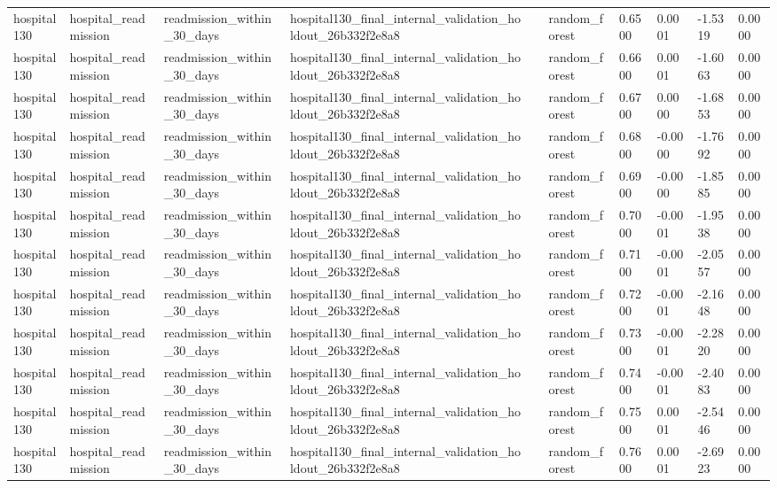 \begin{tabular}{llllllllll}
hospital130 & hospital\_readmission & readmission\_within\_30\_days & hospital130\_final\_internal\_validation\_holdout\_26b332f2e8a8 &  & random\_forest & 0.6500 & 0.0001 & -1.5319 & 0.0000 \\
hospital130 & hospital\_readmission & readmission\_within\_30\_days & hospital130\_final\_internal\_validation\_holdout\_26b332f2e8a8 &  & random\_forest & 0.6600 & 0.0001 & -1.6063 & 0.0000 \\
hospital130 & hospital\_readmission & readmission\_within\_30\_days & hospital130\_final\_internal\_validation\_holdout\_26b332f2e8a8 &  & random\_forest & 0.6700 & 0.0000 & -1.6853 & 0.0000 \\
hospital130 & hospital\_readmission & readmission\_within\_30\_days & hospital130\_final\_internal\_validation\_holdout\_26b332f2e8a8 &  & random\_forest & 0.6800 & -0.0000 & -1.7692 & 0.0000 \\
hospital130 & hospital\_readmission & readmission\_within\_30\_days & hospital130\_final\_internal\_validation\_holdout\_26b332f2e8a8 &  & random\_forest & 0.6900 & -0.0000 & -1.8585 & 0.0000 \\
hospital130 & hospital\_readmission & readmission\_within\_30\_days & hospital130\_final\_internal\_validation\_holdout\_26b332f2e8a8 &  & random\_forest & 0.7000 & -0.0001 & -1.9538 & 0.0000 \\
hospital130 & hospital\_readmission & readmission\_within\_30\_days & hospital130\_final\_internal\_validation\_holdout\_26b332f2e8a8 &  & random\_forest & 0.7100 & -0.0001 & -2.0557 & 0.0000 \\
hospital130 & hospital\_readmission & readmission\_within\_30\_days & hospital130\_final\_internal\_validation\_holdout\_26b332f2e8a8 &  & random\_forest & 0.7200 & -0.0001 & -2.1648 & 0.0000 \\
hospital130 & hospital\_readmission & readmission\_within\_30\_days & hospital130\_final\_internal\_validation\_holdout\_26b332f2e8a8 &  & random\_forest & 0.7300 & -0.0001 & -2.2820 & 0.0000 \\
hospital130 & hospital\_readmission & readmission\_within\_30\_days & hospital130\_final\_internal\_validation\_holdout\_26b332f2e8a8 &  & random\_forest & 0.7400 & -0.0001 & -2.4083 & 0.0000 \\
hospital130 & hospital\_readmission & readmission\_within\_30\_days & hospital130\_final\_internal\_validation\_holdout\_26b332f2e8a8 &  & random\_forest & 0.7500 & 0.0001 & -2.5446 & 0.0000 \\
hospital130 & hospital\_readmission & readmission\_within\_30\_days & hospital130\_final\_internal\_validation\_holdout\_26b332f2e8a8 &  & random\_forest & 0.7600 & 0.0001 & -2.6923 & 0.0000 \\

\end{tabular}
